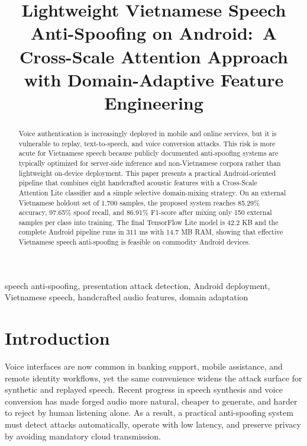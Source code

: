 \documentclass[conference]{IEEEtran}
\begin{document}
\title{Lightweight Vietnamese Speech Anti-Spoofing on Android:\
A Cross-Scale Attention Approach with Domain-Adaptive Feature Engineering}

\author{
\and
{}
\IEEEauthorblockA{\textit{Academy of Cryptography Techniques}\\
Hanoi, Vietnam}
}

\maketitle

\begin{abstract}
Voice authentication is increasingly deployed in mobile and online services, but it is vulnerable to replay, text-to-speech, and voice conversion attacks. This risk is more acute for Vietnamese speech because publicly documented anti-spoofing systems are typically optimized for server-side inference and non-Vietnamese corpora rather than lightweight on-device deployment. This paper presents a practical Android-oriented pipeline that combines eight handcrafted acoustic features with a Cross-Scale Attention Lite classifier and a simple selective domain-mixing strategy. On an external Vietnamese holdout set of 1{,}700 samples, the proposed system reaches 85.29\% accuracy, 97.65\% spoof recall, and 86.91\% F1-score after mixing only 150 external samples per class into training. The final TensorFlow Lite model is 42.2 KB and the complete Android pipeline runs in 311 ms with 14.7 MB RAM, showing that effective Vietnamese speech anti-spoofing is feasible on commodity Android devices.
\end{abstract}

\begin{IEEEkeywords}
speech anti-spoofing, presentation attack detection, Android deployment, Vietnamese speech, handcrafted audio features, domain adaptation
\end{IEEEkeywords}

\section{Introduction}

Voice interfaces are now common in banking support, mobile assistance, and remote identity workflows, yet the same convenience widens the attack surface for synthetic and replayed speech. Recent progress in speech synthesis and voice conversion has made forged audio more natural, cheaper to generate, and harder to reject by human listening alone. As a result, a practical anti-spoofing system must detect attacks automatically, operate with low latency, and preserve privacy by avoiding mandatory cloud transmission.
\end{document}
